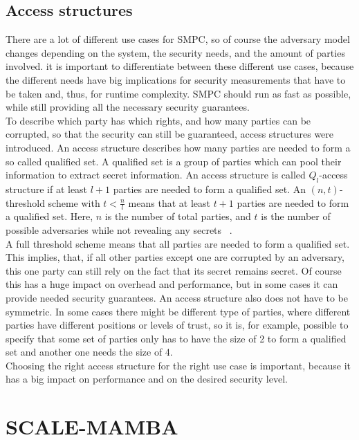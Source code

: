 \documentclass[english,runningheads,a4paper]{llncs}[2018/03/10]
\begin{document}
\subsection{Access structures}
There are a lot of different use cases for SMPC, so of course the adversary model changes depending on the system, the security needs, and the amount of parties involved. it is important to differentiate between these different use cases, because the different needs have big implications for security measurements that have to be taken and, thus, for runtime complexity. SMPC should run as fast as possible, while still providing all the necessary security guarantees.\\
To describe which party has which rights, and how many parties can be corrupted, so that the security can still be guaranteed, access structures were introduced.
An access structure describes how many parties are needed to form a so called qualified set. A qualified set is a group of parties which can pool their information to extract secret information. An access structure is called \(Q_l \)-access structure if at least \(l+1\) parties are needed to  form a qualified set. 
An \((n,t)\)-threshold scheme with \(t<\frac{n}{l}\) means that at least \(t+1\) parties are needed to form a qualified set. Here, \(n\) is the number of total parties, and \(t\) is the number of possible adversaries while not revealing any secrets ~\cite{MPCBook_threshold}.\\
A full threshold scheme means that all parties are needed to form a qualified set. This implies, that, if all other parties except one are corrupted by an adversary, this one party can still rely on the fact that its secret remains secret. Of course this has a huge impact on overhead and performance, but in some cases it can provide needed security guarantees.
An access structure also does not have to be symmetric. In some cases there might be different type of parties, where different parties have different positions or levels of trust, so it is, for example, possible to specify that some set of parties only has to have the size of 2 to form a qualified set and another one needs the size of 4.\\
Choosing the right access structure for the right use case is important, because it has a big impact on performance and on the desired security level.


\section{SCALE-MAMBA}\label{sec:scalemamba}
\end{document}
